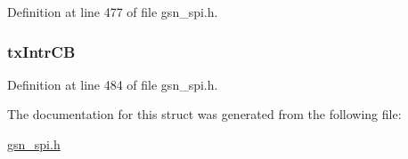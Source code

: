 Definition at line 477 of file gsn\_\-spi.h.

\hypertarget{a00230_a4e134bf841774583e84c1b9d14aa928b}{
\subsubsection[{txIntrCB}]{ {\bf txIntrCB}}}
\label{a00230_a4e134bf841774583e84c1b9d14aa928b}


Definition at line 484 of file gsn\_\-spi.h.



The documentation for this struct was generated from the following file:\begin{DoxyCompactItemize}
\item 
\hyperlink{a00587}{gsn\_\-spi.h}\end{DoxyCompactItemize}
